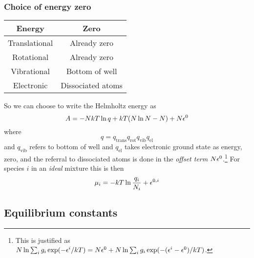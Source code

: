 \subsubsection{Choice of energy zero}
\begin{center}
  \begin{tabular}{c|c}
  Energy & Zero\\
  \hline
  Translational & Already zero\\
  Rotational & Already zero\\
  Vibrational & Bottom of well\\
  Electronic & Dissociated atoms
  \end{tabular}
\end{center}
So we can choose to write the Helmholtz energy as
\begin{equation}
  A=-NkT\ln q+kT(N\ln N-N)+N\epsilon^0
\end{equation}
where 
\begin{equation}
  q=q_{\text{trans}}q_{\text{rot}}q_{\text{vib}}q_{\text{el}}
\end{equation}
and $q_{\text{vib}}$ refers to bottom of well and $q_{\text{el}}$ takes electronic ground state as energy, zero, and the referral to dissociated atoms is done in the \emph{offset term} $N\epsilon^0$.\footnote{This is justified as $N\ln\sum_ig_i\exp(-\epsilon^i/kT)=N\epsilon^0+N\ln\sum_ig_i\exp(-(\epsilon^i-\epsilon^0)/kT)$.} For species $i$ in an \emph{ideal} mixture this is then
\begin{equation}
  \mu_i=-kT\ln\frac{q_i}{N_i}+\epsilon^{0,i}
\end{equation}
\subsection{Equilibrium constants}
